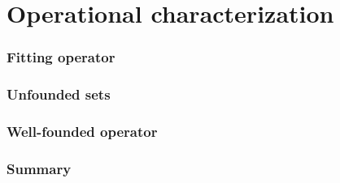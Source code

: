 \part{Operational characterization}


\section{Fitting operator}

\section{Unfounded sets}

\section{Well-founded operator}

\section{Summary}

%
